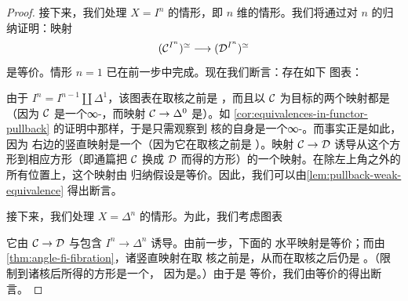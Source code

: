 \begin{proof}
接下来，我们处理 $X = I^n$ 的情形，即 $n$ 维\trSpine{}的情形。我们将通过对 $n$
的归纳证明：映射
\[
(\mathcal{C}^{I^n})^{\simeq} \longrightarrow (\mathcal{D}^{I^n})^{\simeq}
\]
是\trHomotopy{}等价。情形 $n = 1$ 已在前一步中完成。现在我们断言：存在如下%
\trPullback{}图表：
\begin{center}
\end{center}
由于 $I^n = I^{n-1} \amalg \Delta^1$，该图表在取\trGroupoid{}核之前是%
\trPullback{}，而且以 $\mathcal{C}$ 为目标的两个映射都是\trIsofibration{}（因为 $\mathcal{C}$
是一个∞-\trCategory{}，而映射 $\mathcal{C} \to \Delta^0$ 是\trIsofibration{}）。如
\cref{cor:equivalences-in-functor-pullback} 的证明中那样，于是只需观察到%
\trGroupoid{}核的\trPullback{}自身是一个∞-\trGroupoid{}。而事实正是如此，因为
右边的竖直映射是一个\trKanFibration{}（因为它在取\trGroupoid{}核之前是%
\trIsofibration{}）。映射 $\mathcal{C} \to \mathcal{D}$ 诱导从这个方形到相应方形（即通篇把
$\mathcal{C}$ 换成 $\mathcal{D}$ 而得的方形）的一个映射。在除左上角之外的所有位置上，这个映射由
归纳假设是\trHomotopy{}等价。因此，我们可以由\cref{lem:pullback-weak-equivalence}
得出断言。

接下来，我们处理 $X = \Delta^n$ 的情形。为此，我们考虑图表
\begin{center}
\end{center}
它由\trFunctor{} $\mathcal{C} \to \mathcal{D}$ 与包含 $I^n \to \Delta^n$ 诱导。由前一步，下面的
水平映射是\trHomotopy{}等价；而由\cref{thm:angle-fi-fibration}，诸竖直映射在取%
\trGroupoid{}核之前是\trTrivialFibration{}，从而在取\trGroupoid{}核之后仍是%
\trTrivialFibration{}。（限制到诸\trGroupoid{}核后所得的方形是一个\trPullback{}，
因为\trTrivialFibration{}是\trConservative{}。）由于\trTrivialFibration{}是%
\trHomotopy{}等价，我们由\trHomotopy{}等价的\trThreeForTwoProperty{}得出断言。


\end{proof}
